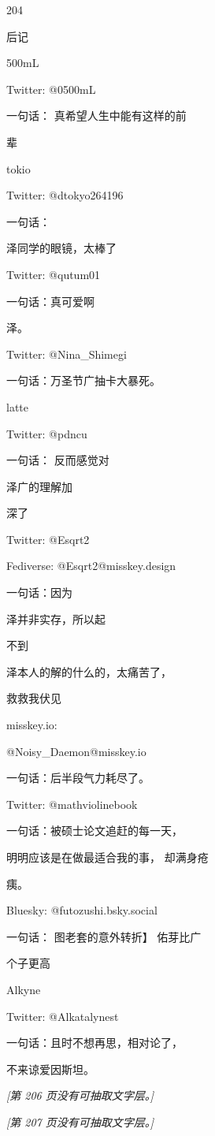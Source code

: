 204\par
后记\par
500mL\par
Twitter: @0500mL\par
一句话： 真希望人生中能有这样的前\par
辈\par
tokio\par
Twitter: @dtokyo264196\par
一句话：\par
泽同学的眼镜，太棒了\par
Twitter: @qutum01\par
一句话：真可爱啊\par
泽。\par
Twitter: @Nina\_Shimegi\par
一句话：万圣节广抽卡大暴死。\par
latte\par
Twitter: @pdncu\par
一句话： 反而感觉对\par
泽广的理解加\par
深了\par
Twitter: @Esqrt2\par
Fediverse: @Esqrt2@misskey.design\par
一句话：因为\par
泽并非实存，所以起\par
不到\par
泽本人的解的什么的，太痛苦了，\par
救救我伏见\par
misskey.io:\par
@Noisy\_Daemon@misskey.io\par
一句话：后半段气力耗尽了。\par
Twitter: @mathviolinebook\par
一句话：被硕士论文追赶的每一天，\par
明明应该是在做最适合我的事， 却满身疮\par
痍。\par
Bluesky: @futozushi.bsky.social\par
一句话： 图老套的意外转折】 佑芽比广\par
个子更高\par
Alkyne\par
Twitter: @Alkatalynest\par
一句话：且时不想再思，相对论了，\par
不来谅爱因斯坦。\par

\noindent\textit{[第 206 页没有可抽取文字层。]}\par

\noindent\textit{[第 207 页没有可抽取文字层。]}\par
\endgroup
